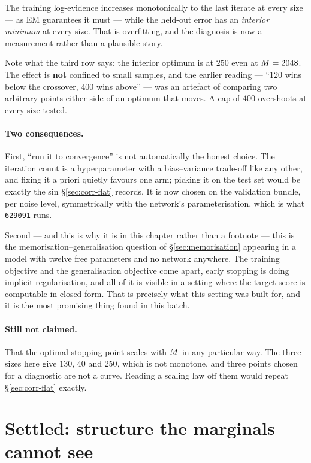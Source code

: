 \begin{pitfall}
\noindent
The training log-evidence increases monotonically to the last iterate at every size --- as EM
guarantees it must --- while the held-out error has an \emph{interior minimum} at every size. That
is overfitting, and the diagnosis is now a measurement rather than a plausible story.

Note what the third row says: the interior optimum is at $250$ even at $M=2048$. The effect is
\textbf{not} confined to small samples, and the earlier reading --- ``$120$ wins below the
crossover, $400$ wins above'' --- was an artefact of comparing two arbitrary points either side of
an optimum that moves. A cap of $400$ overshoots at every size tested.

\paragraph{Two consequences.} First, ``run it to convergence'' is not automatically the honest
choice. The iteration count is a hyperparameter with a bias--variance trade-off like any other, and
fixing it a priori quietly favours one arm; picking it on the test set would be exactly the sin
\S\ref{sec:corr-flat} records. It is now chosen on the validation bundle, per noise level,
symmetrically with the network's parameterisation, which is what \texttt{629091} runs.

Second --- and this is why it is in this chapter rather than a footnote --- this is the
memorisation--generalisation question of \S\ref{sec:memorisation} appearing in a model with twelve
free parameters and no network anywhere. The training objective and the generalisation objective
come apart, early stopping is doing implicit regularisation, and all of it is visible in a setting
where the target score is computable in closed form. That is precisely what this setting was built
for, and it is the most promising thing found in this batch.

\paragraph{Still not claimed.} That the optimal stopping point scales with $M$ in any
particular way. The three sizes here give $130$, $40$ and $250$, which is not monotone, and three
points chosen for a diagnostic are not a curve. Reading a scaling law off them would repeat
\S\ref{sec:corr-flat} exactly.
\end{pitfall}

\section{Settled: structure the marginals cannot see}

